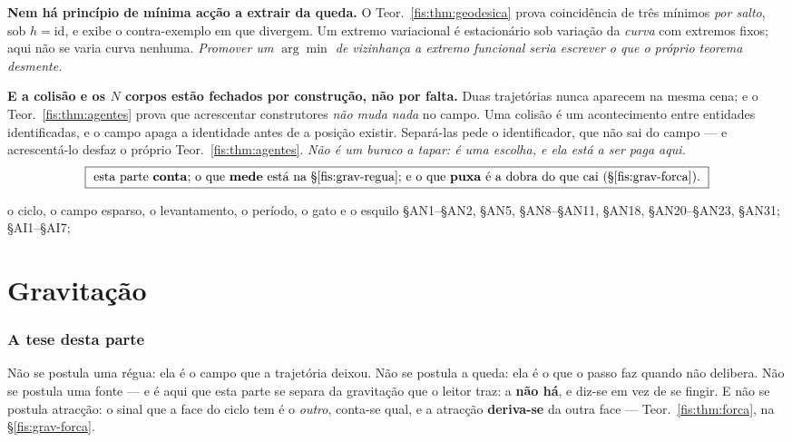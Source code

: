 \documentclass[livro.tex]{subfiles}
\begin{document}
\medskip\noindent\textbf{Nem há princípio de mínima acção a extrair da queda.} O
Teor.~\ref{fis:thm:geodesica} prova coincidência de três mínimos \emph{por
salto}, sob $h=\mathrm{id}$, e exibe o contra-exemplo em que divergem. Um extremo
variacional é estacionário sob variação da \emph{curva} com extremos fixos; aqui
não se varia curva nenhuma. \emph{Promover um $\arg\min$ de vizinhança a extremo
funcional seria escrever o que o próprio teorema desmente.}

\medskip\noindent\textbf{E a colisão e os $N$ corpos estão fechados por
construção, não por falta.} Duas trajetórias nunca aparecem na mesma cena; e o
Teor.~\ref{fis:thm:agentes} prova que acrescentar construtores \emph{não muda
nada} no campo. Uma colisão é um acontecimento entre entidades identificadas, e o
campo apaga a identidade antes de a posição existir. Separá-las pede o
identificador, que não sai do campo --- e acrescentá-lo desfaz o próprio
Teor.~\ref{fis:thm:agentes}. \emph{Não é um buraco a tapar: é uma escolha, e ela
está a ser paga aqui.}
\[
\boxed{\ \text{esta parte \textbf{conta}; o que \textbf{mede} está na
§\ref{fis:grav-regua}; e o que \textbf{puxa} é a dobra do que cai
(§\ref{fis:grav-forca}).}\ }
\]

        {o ciclo, o campo esparso, o levantamento, o período, o gato e o esquilo}
        { §AN1--§AN2, §AN5, §AN8--§AN11, §AN18, §AN20--§AN23, §AN31;  §AI1--§AI7; }
\part{Gravitação}

\section*{A tese desta parte}\label{fis:grav-tese}

\noindent Não se postula uma régua: ela é o campo que a trajetória deixou. Não se
postula a queda: ela é o que o passo faz quando não delibera. Não se postula uma
fonte --- e é aqui que esta parte se separa da gravitação que o leitor traz: a
\textbf{não há}, e diz-se em vez de se fingir. E não se postula atracção: o sinal
que a face do ciclo tem é o \emph{outro}, conta-se qual, e a atracção
\textbf{deriva-se} da outra face --- Teor.~\ref{fis:thm:forca}, na
§\ref{fis:grav-forca}.
\end{document}
